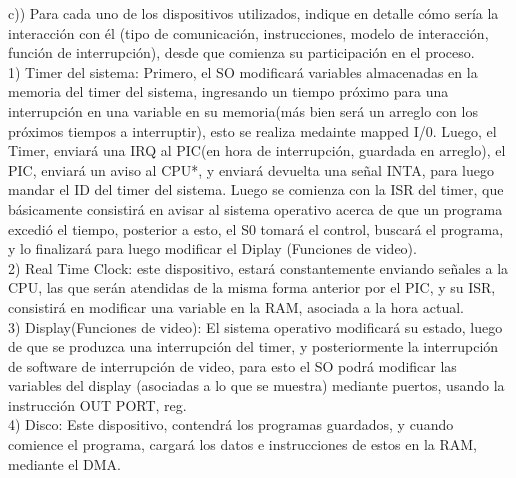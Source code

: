 \documentclass[letter]{article}
\begin{document}
\begin{pregunta}{1}
	c)) Para cada uno de los dispositivos utilizados, indique en detalle cómo sería la interacción con  él (tipo de comunicación, instrucciones, modelo de interacción, función de interrupción), desde que comienza su participación en el proceso. 
	$$ $$
	1) Timer del sistema: Primero, el SO modificará variables almacenadas en la memoria del timer del sistema, ingresando un tiempo próximo para una interrupción en una variable en su memoria(más bien será un arreglo con los próximos tiempos a interruptir), esto se realiza medainte mapped I/0. Luego, el Timer, enviará una IRQ al PIC(en hora de interrupción, guardada en arreglo), el PIC, enviará un aviso al CPU*, y enviará devuelta una señal INTA, para luego mandar el ID del timer del sistema. Luego se comienza con la ISR del timer, que básicamente consistirá en avisar al sistema operativo acerca de que un programa excedió el tiempo, posterior a esto, el S0 tomará el control, buscará el programa, y lo finalizará para luego modificar el Diplay (Funciones de video).
	$$ $$
	2) Real Time Clock: este dispositivo, estará constantemente enviando señales a la CPU, las que serán atendidas de la misma forma anterior por el PIC, y su ISR, consistirá en modificar una variable en la RAM, asociada a la hora actual. 
	$$ $$
	3) Display(Funciones de video): El sistema operativo modificará su estado, luego de que se produzca una interrupción del timer, y posteriormente la interrupción de software de interrupción de video, para esto el SO podrá modificar las variables del display (asociadas a lo que se muestra) mediante puertos, usando la instrucción OUT PORT, reg.
	$$ $$
	4) Disco: Este dispositivo, contendrá los programas guardados, y cuando comience el programa, cargará los datos e instrucciones de estos en la RAM, mediante el DMA.
	
	

	
	
	
	
	
	
	
	
	
	
	\end{pregunta}
	
\end{document}

